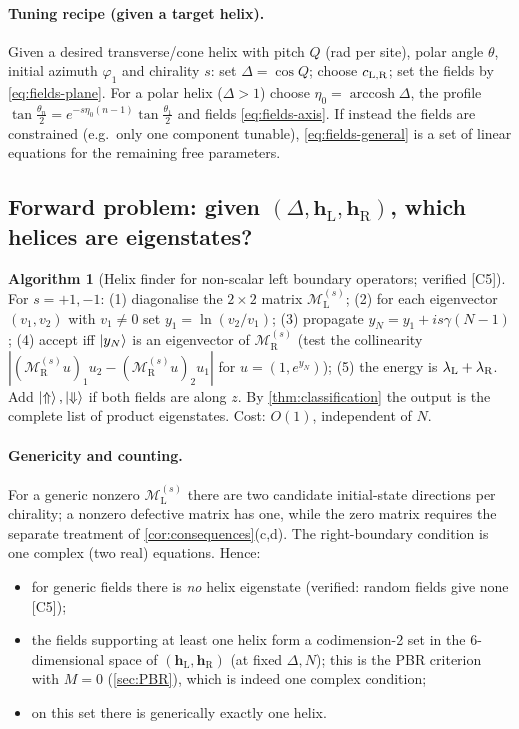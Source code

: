 \documentclass[11pt,a4paper]{article}
\theoremstyle{definition}
\newtheorem{algorithm}[theorem]{Algorithm}
\newcommand{\hL}{\mathbf h_{\mathrm L}}
\newcommand{\hR}{\mathbf h_{\mathrm R}}
\newcommand{\ML}[1][s]{\mathcal M_{\mathrm L}^{(#1)}}
\newcommand{\MR}[1][s]{\mathcal M_{\mathrm R}^{(#1)}}
\newcommand{\ver}[1]{\textsf{[#1]}}   %
\begin{document}
\paragraph{Tuning recipe (given a target helix).} Given a desired transverse/cone helix with pitch $Q$ (rad per site), polar angle $\theta$, initial azimuth $\varphi_1$ and chirality $s$: set $\Delta=\cos Q$; choose $c_{\rm L,R}$; set the fields by \eqref{eq:fields-plane}. For a polar helix ($\Delta>1$) choose $\eta_0=\operatorname{arccosh}\Delta$, the profile $\tan\frac{\theta_n}2=e^{-s\eta_0(n-1)}\tan\frac{\theta_1}{2}$ and fields \eqref{eq:fields-axis}. If instead the fields are constrained (e.g.\ only one component tunable), \eqref{eq:fields-general} is a set of linear equations for the remaining free parameters.

\subsection{Forward problem: given $(\Delta,\hL,\hR)$, which helices are eigenstates?}\label{sec:forward}
\begin{algorithm}[Helix finder for non-scalar left boundary operators; verified \ver{C5}]\label{alg:finder}
For $s=+1,-1$: (1) diagonalise the $2\times2$ matrix $\ML$; (2) for each eigenvector $(v_1,v_2)$ with $v_1\neq0$ set $y_1=\ln(v_2/v_1)$; (3) propagate $y_N=y_1+is\gamma(N-1)$; (4) accept iff $\ket{y_N}$ is an eigenvector of $\MR$ (test the collinearity $|(\MR u)_1u_2-(\MR u)_2u_1|$ for $u=(1,e^{y_N})$); (5) the energy is $\lambda_{\rm L}+\lambda_{\rm R}$. Add $\ket\Uparrow,\ket\Downarrow$ if both fields are along $z$. By \cref{thm:classification} the output is the complete list of product eigenstates. Cost: $O(1)$, independent of $N$.
\end{algorithm}

\paragraph{Genericity and counting.} For a generic nonzero $\ML$ there are two candidate initial-state directions per chirality; a nonzero defective matrix has one, while the zero matrix requires the separate treatment of \cref{cor:consequences}(c,d). The right-boundary condition is one complex (two real) equations. Hence:
\begin{itemize}
\item for generic fields there is \emph{no} helix eigenstate (verified: random fields give none \ver{C5});
\item the fields supporting at least one helix form a codimension-2 set in the 6-dimensional space of $(\hL,\hR)$ (at fixed $\Delta,N$); this is the PBR criterion with $M=0$ (\cref{sec:PBR}), which is indeed one complex condition;
\item on this set there is generically exactly one helix.
\end{itemize}
\end{document}
